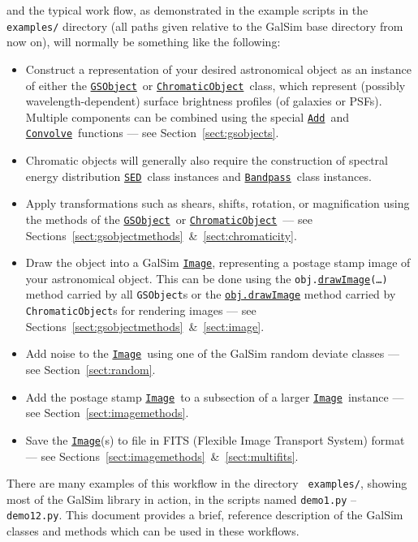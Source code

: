 \documentclass[preprint,10pt]{../../devel/modules/aastex}
\newcommand\GSObject{\href{http://galsim-developers.github.io/GalSim/classgalsim_1_1base_1_1_g_s_object.html}{\texttt{GSObject}}}
\newcommand\ChromaticObject{\href{http://galsim-developers.github.io/GalSim/classgalsim_1_1chromatic_1_1_chromatic_object.html}{\texttt{ChromaticObject}}}
\newcommand\drawImage{\href{http://galsim-developers.github.io/GalSim/classgalsim_1_1base_1_1_g_s_object.html\#aafe6ca9d84fe81543fbc105b897273db}{\texttt{drawImage}}}
\newcommand\Bandpass{\href{http://galsim-developers.github.io/GalSim/classgalsim_1_1bandpass_1_1_bandpass.html}{\texttt{Bandpass}}}
\newcommand\SED{\href{http://galsim-developers.github.io/GalSim/classgalsim_1_1sed_1_1_s_e_d.html}{\texttt{SED}}}
\newcommand\Image{\href{http://galsim-developers.github.io/GalSim/classgalsim_1_1image_1_1_image.html}{\texttt{Image}}}
\newcommand\Add{\href{http://galsim-developers.github.io/GalSim/namespacegalsim_1_1compound.html\#ad3f305087db1b740376666d9c022d94e}{\texttt{Add}}}
\newcommand\Convolve{\href{http://galsim-developers.github.io/GalSim/namespacegalsim_1_1compound.html\#a17ccb8acb75a4eb6e35e791e4177957b}{\texttt{Convolve}}}
\begin{document}
and the typical work flow, as demonstrated in the example scripts in the {\tt
examples/} directory (all paths given relative to
the GalSim base directory from now on), will normally
be something like the following:
\begin{itemize}

\item Construct a representation of your desired astronomical object
  as an instance of either the \GSObject\ or \ChromaticObject\ class, which represent (possibly wavelength-dependent) surface brightness profiles (of galaxies or PSFs).  Multiple components can be
  combined using the special \Add\ and \Convolve\ functions --- see Section~\ref{sect:gsobjects}.
\item Chromatic objects will generally also require the construction of spectral energy distribution
  \SED\ class instances and \Bandpass\ class instances.
\item Apply transformations such as shears, shifts, rotation, or magnification
  using the methods of the \GSObject\ or \ChromaticObject\ --- see
  Sections~\ref{sect:gsobjectmethods}~\&~\ref{sect:chromaticity}.
\item Draw the object into a GalSim \Image, representing a postage
  stamp image of your astronomical object.  This can be done using the
  \texttt{obj.}\drawImage\texttt{(\dots)}
  method carried by all \texttt{GSObject}s or the \href{http://galsim-developers.github.io/GalSim/classgalsim_1_1chromatic_1_1_chromatic_object.html#a4228098295ee04e4f491567a9ce3b28f}{\texttt{obj.drawImage}} method carried by
  \texttt{ChromaticObject}s for rendering images --- see
  Sections~\ref{sect:gsobjectmethods}~\&~\ref{sect:image}.
\item Add noise to the \Image\ using one of the GalSim
  random deviate classes --- see Section~\ref{sect:random}.
\item Add the postage stamp \Image\ to a subsection of a larger
  \Image\ instance --- see Section~\ref{sect:imagemethods}.
\item Save the \Image(s) to file in FITS (Flexible Image Transport
  System) format --- see Sections~\ref{sect:imagemethods}~\&~\ref{sect:multifits}.
\end{itemize}

There are many examples of this workflow in the directory {\tt
 examples/}, showing most of the GalSim library in action, in
the scripts named \texttt{demo1.py} -- \texttt{demo12.py}.  This
document provides a brief, reference description of the GalSim classes
and methods which can be used in these workflows.
\end{document}
